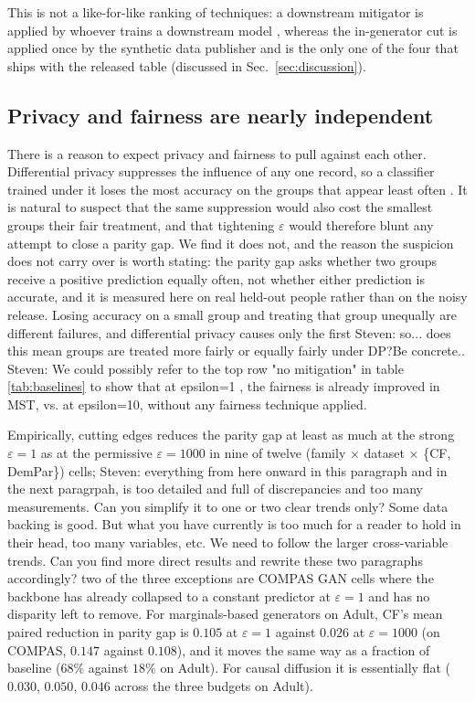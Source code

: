 \documentclass{article}
\newcommand{\s}[1]{\textcolor{Dandelion}{Steven: #1}}
\begin{document}
This is not a like-for-like ranking of techniques: a downstream mitigator is
applied by whoever trains a downstream model , whereas the in-generator cut is applied once
by the synthetic data publisher and is the only one of the four that ships with the released
table (discussed in Sec.~\ref{sec:discussion}).

\subsection{Privacy and fairness are nearly independent}

There is a reason to expect privacy and fairness to pull against each other.
Differential privacy suppresses the influence of any one record, so a
classifier trained under it loses the most accuracy on the groups that appear
least often \citep{bagdasaryan2019disparate}. It is natural to suspect that
the same suppression would also cost the smallest groups their fair treatment,
and that tightening $\varepsilon$ would therefore blunt any attempt to close a
parity gap. We find it does not, and the reason the suspicion does not carry
over is worth stating: the parity gap asks whether two groups receive a
positive prediction equally often, not whether either prediction is accurate,
and it is measured here on real held-out people rather than on the noisy
release. Losing accuracy on a small group and treating that group unequally
are different failures, and differential privacy causes only the first \s{so... does this mean groups are treated more fairly or equally fairly under DP?Be concrete.}. \s{We could possibly refer to the top row "no mitigation" in table \ref{tab:baselines} to show that at epsilon=1 , the fairness is already improved in MST, vs. at epsilon=10, without any fairness technique applied.}

Empirically, cutting edges reduces the parity gap at least as much at the
strong $\varepsilon{=}1$ as at the permissive $\varepsilon{=}1000$ in nine of
twelve (family $\times$ dataset $\times$ \{CF, DemPar\}) cells; \s{everything from here onward in this paragraph and in the next paragrpah, is too detailed and full of discrepancies and too many measurements. Can you simplify it to one or two clear trends only? Some data backing is good. But what you have currently is too much for a reader to hold in their head, too many variables, etc. We need to follow the larger cross-variable trends. Can you find more direct results and rewrite these two paragraphs accordingly?} two of the
three exceptions are COMPAS GAN cells where the backbone has already collapsed
to a constant predictor at $\varepsilon{=}1$ and has no disparity left to
remove. For marginals-based generators on Adult, CF's mean paired reduction in
parity gap is $0.105$ at $\varepsilon{=}1$ against $0.026$ at
$\varepsilon{=}1000$ (on COMPAS, $0.147$ against $0.108$), and it moves the
same way as a fraction of baseline ($68\%$ against $18\%$ on Adult). For
causal diffusion it is essentially flat ($0.030$, $0.050$, $0.046$ across the
three budgets on Adult).
\end{document}
